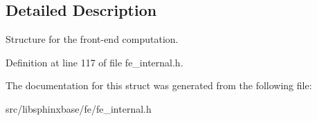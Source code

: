 \subsection{Detailed Description}
Structure for the front-\/end computation. 



Definition at line 117 of file fe\+\_\+internal.\+h.



The documentation for this struct was generated from the following file\+:\begin{DoxyCompactItemize}
\item 
src/libsphinxbase/fe/fe\+\_\+internal.\+h\end{DoxyCompactItemize}
